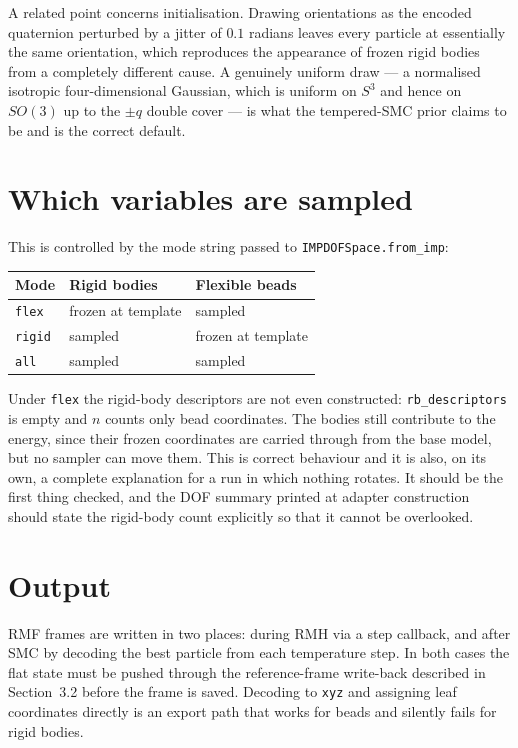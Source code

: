\documentclass[11pt]{article}
\newcommand{\code}[1]{\texttt{#1}}
\begin{document}
A related point concerns initialisation. Drawing orientations as the encoded
quaternion perturbed by a jitter of $0.1$ radians leaves every particle at
essentially the same orientation, which reproduces the appearance of frozen
rigid bodies from a completely different cause. A genuinely uniform draw ---
a normalised isotropic four-dimensional Gaussian, which is uniform on $S^3$ and
hence on $SO(3)$ up to the $\pm q$ double cover --- is what the tempered-SMC
prior claims to be and is the correct default.

\section{Which variables are sampled}

This is controlled by the mode string passed to \code{IMPDOFSpace.from\_imp}:

\begin{center}
\begin{tabular}{@{}lll@{}}
\toprule
Mode & Rigid bodies & Flexible beads \\
\midrule
\code{flex}  & frozen at template & sampled \\
\code{rigid} & sampled            & frozen at template \\
\code{all}   & sampled            & sampled \\
\bottomrule
\end{tabular}
\end{center}

Under \code{flex} the rigid-body descriptors are not even constructed:
\code{rb\_descriptors} is empty and $n$ counts only bead coordinates. The bodies
still contribute to the energy, since their frozen coordinates are carried
through from the base model, but no sampler can move them. This is correct
behaviour and it is also, on its own, a complete explanation for a run in which
nothing rotates. It should be the first thing checked, and the DOF summary
printed at adapter construction should state the rigid-body count explicitly so
that it cannot be overlooked.

\section{Output}

RMF frames are written in two places: during RMH via a step callback, and after
SMC by decoding the best particle from each temperature step. In both cases the
flat state must be pushed through the reference-frame write-back described in
Section~3.2 before the frame is saved. Decoding to \code{xyz} and assigning leaf
coordinates directly is an export path that works for beads and silently fails
for rigid bodies.
\end{document}
